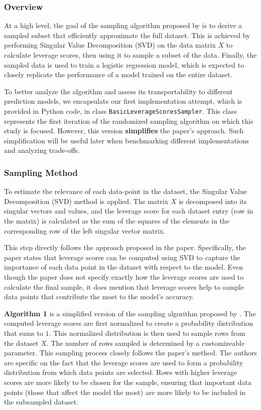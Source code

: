 \documentclass{article}
\theoremstyle{plain}
\theoremstyle{definition}
\theoremstyle{remark}
\begin{document}
\subsubsection{Overview}

At a high level, the goal of the sampling algorithm proposed by \citeauthor{chow24} is to derive a sampled subset that efficiently approximate the full dataset. This is achieved by performing Singular Value Decomposition (SVD) on the data matrix $X$ to calculate leverage scores, then using it to sample a subset of the data. Finally, the sampled data is used to train a logistic regression model, which is expected to closely replicate the performance of a model trained on the entire dataset.

To better analyze the algorithm and assess its transportability to different prediction models, we encapsulate our first implementation attempt, which is provided in Python code, in class \texttt{BasicLeverageScoresSampler}. This class represents the first iteration of the randomized sampling algorithm on which this study is focused. However, this version \textbf{simplifies} the paper's approach. Such simplification will be useful later when benchmarking different implementations and analyzing trade-offs.


\subsubsection{Sampling Method}

To estimate the relevance of each data-point in the dataset, the Singular Value Decomposition (SVD) method is applied. The matrix $X$ is decomposed into its singular vectors and values, and the leverage score for each dataset entry (row in the matrix) is calculated as the sum of the squares of the elements in the corresponding row of the left singular vector matrix.

This step directly follows the approach proposed in the paper. Specifically, the paper states that leverage scores can be computed using SVD to capture the importance of each data point in the dataset with respect to the model. Even though the paper does not specify exactly how the leverage scores are used to calculate the final sample, it does mention that leverage scores help to sample data points that contribute the most to the model’s accuracy.

\textbf{Algorithm 1} is a simplified version of the sampling algorithm proposed by \citet{chow24}. The computed leverage scores are first normalized to create a probability distribution that sums to $1$. This normalized distribution is then used to sample rows from the dataset $X$. The number of rows sampled is determined by a customizeable parameter. This sampling process closely follows the paper’s method. The authors are specific on the fact that the leverage scores are used to form a probability distribution from which data points are selected. Rows with higher leverage scores are more likely to be chosen for the sample, ensuring that important data points (those that affect the model the most) are more likely to be included in the subsampled dataset.
\end{document}
